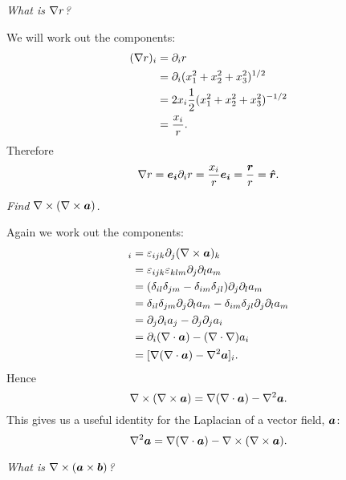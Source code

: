 \begin{example}
    \textit{What is \(\nabla r\)?}
    
    We will work out the components:
    \begin{align*}
        (\nabla r)_i &= \partial_i r\\
        &= \partial_i(x_1^2 + x_2^2 + x_3^2)^{1/2}\\
        &= 2x_i\frac{1}{2}(x_1^2 + x_2^2 + x_3^2)^{-1/2}\\
        &= \frac{x_i}{r}.
    \end{align*}
    Therefore
    \[\nabla r = \bm{e_{i}}\partial_i r = \frac{x_i}{r}\bm{e_{i}} = \frac{\bm{r}}{r} = \bm{\hat{r}}.\]
    
    \textit{Find \(\nabla\times(\nabla\times\bm{a})\).}
    
    Again we work out the components:
    \begin{align*}
        [\curl(\curl\vv{a})]_i &= \varepsilon_{ijk}\partial_j(\curl\vv{a})_k\\
        &= \varepsilon_{ijk}\varepsilon_{klm}\partial_j\partial_la_m\\
        &= (\delta_{il}\delta_{jm} - \delta_{im}\delta_{jl})\partial_j\partial_la_m\\
        &= \delta_{il}\delta_{jm}\partial_j\partial_la_m - \delta_{im}\delta_{jl}\partial_j\partial_la_m\\
        &= \partial_j\partial_ia_j - \partial_j\partial_ja_i\\
        &= \partial_i(\div\vv{a}) - (\div\grad)a_i\\
        &= [\grad(\div\vv{a}) - \laplacian\vv{a}]_i.
    \end{align*}
    Hence
    \[\nabla\times(\nabla\times\bm{a}) = \nabla(\nabla\cdot\bm{a}) - \nabla^2\bm{a}.\]
    This gives us a useful identity for the Laplacian of a vector field, \(\bm{a}\):
    \[\nabla^2\bm{a} = \nabla(\nabla\cdot\bm{a}) - \nabla\times(\nabla\times\bm{a}).\]
    
    \textit{What is \(\nabla\times(\bm{a}\times\bm{b})\)?}
    

\end{example}

